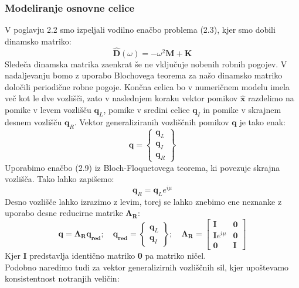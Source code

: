 \documentclass[12pt]{report}
\begin{document}
\subsubsection{Modeliranje osnovne celice}
V poglavju 2.2 smo izpeljali vodilno enačbo problema (2.3), kjer smo dobili dinamsko matriko:
\begin{equation}
  \mathbf{\hat{D}}(\omega)= -{\omega}^2 \mathbf{M}+\mathbf{K}
\end{equation}
Sledeča dinamska matrika zaenkrat še ne vključuje nobenih robnih pogojev. V nadaljevanju bomo z uporabo Blochovega teorema za našo
dinamsko matriko določili periodične robne pogoje. Končna celica bo v numeričnem modelu imela več kot le dve vozlišči, zato v naslednjem koraku vektor pomikov $\mathbf{\hat{x}}$
razdelimo na pomike v levem vozlišču $\mathbf{q}_L$, pomike v sredini celice $\mathbf{q}_I$ in pomike v skrajnem desnem vozlišču $\mathbf{q}_R$. Vektor generaliziranih vozliščnih pomikov $\mathbf{q}$
je tako enak:
\begin{equation}
  \mathbf{q}=
    \begin{Bmatrix}
      \mathbf{q}_L \\
      \mathbf{q}_I \\
      \mathbf{q}_R
    \end{Bmatrix}
\end{equation}
Uporabimo enačbo (2.9) iz Bloch-Floquetovega teorema, ki povezuje skrajna vozlišča. Tako lahko zapišemo:
\begin{equation}
  \mathbf{q}_R = \mathbf{q}_L e^{i\mu}
\end{equation}
Desno vozlišče lahko izrazimo z levim, torej se lahko znebimo ene neznanke z uporabo desne reducirne matrike $\mathbf{\Lambda_R}$:
\begin{equation}
  \mathbf{q}=\mathbf{\Lambda_R q_{red}}; \quad 
  \mathbf{q_{red}} = \begin{Bmatrix}
    \mathbf{q}_L \\
    \mathbf{q}_I
  \end{Bmatrix}; \quad
  \mathbf{\Lambda_R} = \begin{bmatrix}
    \mathbf{I} & \mathbf{0} \\
    \mathbf{I}e^{i\mu} & \mathbf{0} \\
    \mathbf{0} & \mathbf{I}
  \end{bmatrix}
\end{equation}
Kjer \textbf{I} predstavlja identično matriko \textbf{0} pa matriko ničel.\\
Podobno naredimo tudi za vektor generalizirnih vozliščnih sil, kjer upoštevamo konsistentnost notranjih veličin:
\end{document}
